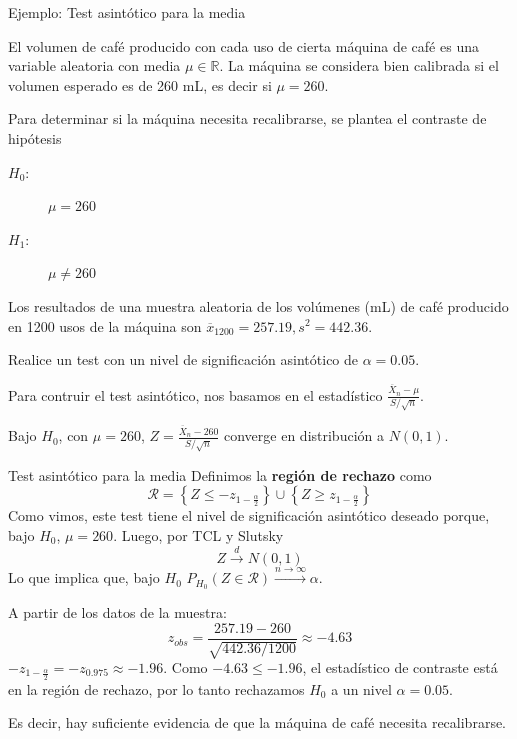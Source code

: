 \documentclass{beamer}
\theoremstyle{definition}
\newcommand{\cw}{\overset{d}{\rightarrow}}
\begin{document}
\begin{frame}{\color{rosee}Ejemplo: Test asint\'otico para la media}\small
  

El volumen de café producido con cada uso de cierta máquina de café es una variable aleatoria con media $\mu\in\mathbb{R}$. La máquina se considera bien calibrada si el volumen esperado es de 260 mL, es decir si $\mu=260$.

\medskip
Para determinar si la máquina necesita recalibrarse, se plantea el contraste de hipótesis
\begin{description}
\item[$H_0:$] $\mu = 260$
\item[$H_1:$] $\mu \neq 260$
\end{description}

\medskip
Los resultados de una muestra aleatoria de los volúmenes (mL) de café producido en 1200 usos de la máquina son $\overline{x}_{1200}=257.19,s^2=442.36$.

\medskip
Realice un test con un nivel de significación asintótico de $\alpha=0.05$.

  

Para contruir el test asintótico, nos basamos en el estadístico $\frac{\overline{X}_n-\mu}{S/\sqrt{n}}$.

Bajo $H_0$, con $\mu=260$, $Z=\frac{\overline{X}_n-260}{S/\sqrt{n}}$ converge en distribución a $N(0,1)$.
\end{frame}

\begin{frame}{\color{rosee}Test asint\'otico para la media}\small
Definimos la \textbf{región de rechazo} como
\[\mathcal{R}=\left\{Z\leq -z_{1-\frac{\alpha}{2}}\right\}\cup\left\{Z\geq z_{1-\frac{\alpha}{2}}\right\}\]
Como vimos, este test tiene el nivel de significación asintótico deseado porque, bajo $H_0$, $\mu=260$. Luego, por TCL y Slutsky
\[Z\cw N(0,1)\]
Lo que implica que, bajo $H_0$ $P_{H_0}(Z\in\mathcal{R})\xrightarrow{n\to\infty} \alpha$.

A partir de los datos de la muestra:
\[z_{obs}=\frac{257.19-260}{\sqrt{442.36/1200}}\approx -4.63\]
$-z_{1-\frac{\alpha}{2}}=-z_{0.975}\approx -1.96$. Como $-4.63\leq -1.96$, el estadístico de contraste está en la región de rechazo, por lo tanto rechazamos $H_0$ a un nivel $\alpha=0.05$. 

Es decir, hay suficiente evidencia de que la máquina de café necesita recalibrarse.

  
\end{frame}
\end{document}
